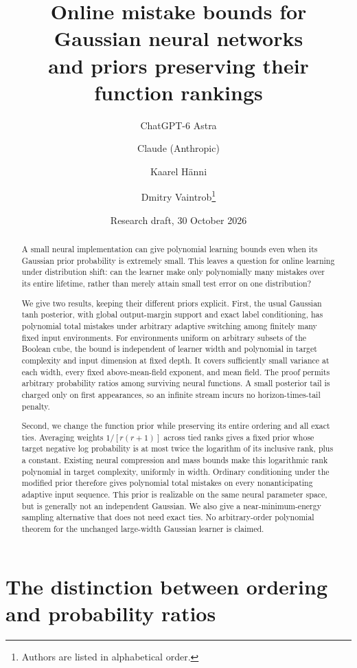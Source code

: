 \documentclass[11pt]{article}
\title{Online mistake bounds for Gaussian neural networks\\and priors preserving their function rankings}
\author{ChatGPT-6 Astra \and Claude (Anthropic) \and Kaarel H\"anni \and Dmitry Vaintrob\thanks{Authors are listed in alphabetical order.}}
\date{Research draft, 30 October 2026}
\begin{document}
\maketitle
\begin{abstract}
A small neural implementation can give polynomial learning bounds even
when its Gaussian prior probability is extremely small. This leaves a
question for online learning under distribution shift: can the learner
make only polynomially many mistakes over its entire lifetime, rather
than merely attain small test error on one distribution?

We give two results, keeping their different priors explicit. First, the
usual Gaussian tanh posterior, with global output-margin support and
exact label conditioning, has polynomial total mistakes under arbitrary
adaptive switching among finitely many fixed input environments. For
environments uniform on arbitrary subsets of the Boolean cube, the bound
is independent of learner width and polynomial in target complexity and
input dimension at fixed depth. It covers sufficiently small variance
at each width, every fixed above-mean-field exponent, and mean field.
The proof permits arbitrary probability ratios among surviving neural
functions. A small posterior tail is charged only on first appearances,
so an infinite stream incurs no horizon-times-tail penalty.

Second, we change the function prior while preserving its entire ordering
and all exact ties. Averaging weights $1/[r(r+1)]$ across tied ranks gives
a fixed prior whose target negative log probability is at most twice the
logarithm of its inclusive rank, plus a constant. Existing neural
compression and mass bounds make this logarithmic rank polynomial in
target complexity, uniformly in width. Ordinary conditioning under the
modified prior therefore gives polynomial total mistakes on every
nonanticipating adaptive input sequence. This prior is realizable on the
same neural parameter space, but is generally not an independent Gaussian.
We also give a near-minimum-energy sampling alternative that does not need
exact ties. No arbitrary-order polynomial theorem for the unchanged
large-width Gaussian learner is claimed.
\end{abstract}

\section{The distinction between ordering and probability ratios}
\end{document}
